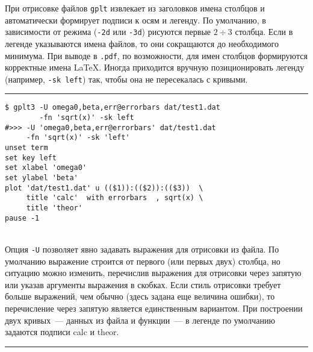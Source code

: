 \documentclass[12pt]{article}
\def\gplt{{\tt gplt}}
\def\pdf{{\tt .pdf}}
\begin{document}
\vspace{5mm}
При отрисовке файлов \gplt{} извлекает из заголовков имена столбцов и автоматически формирует подписи к осям и легенду.
По умолчанию, в зависимости от режима (\verb'-2d' или \verb'-3d') рисуются первые $2\div3$ столбца.
Если в легенде указываются имена файлов,
то они сокращаются до необходимого минимума. При выводе в \pdf{}, по возможности, для имен столбцов формируются корректные имена \LaTeX.
Иногда приходится вручную позиционировать легенду (например, \verb'-sk left') так, чтобы она не пересекалась с кривыми.\\

\hrule %

\vspace{3mm}
\noindent
\begin{minipage}[b]{.59\textwidth}
\small
\begin{verbatim}
$ gplt3 -U omega0,beta,err@errorbars dat/test1.dat 
        -fn 'sqrt(x)' -sk left
#>>> -U 'omega0,beta,err@errorbars' dat/test1.dat 
     -fn 'sqrt(x)' -sk 'left'
unset term
set key left
set xlabel 'omega0'
set ylabel 'beta'
plot 'dat/test1.dat' u (($1)):(($2)):(($3))  \
     title 'calc'  with errorbars  , sqrt(x) \
     title 'theor'   
pause -1
\end{verbatim}
\end{minipage}
\\[5mm]
Опция \verb'-U' позволяет явно задавать выражения для отрисовки из файла. По умолчанию выражение строится от первого (или первых двух) столбца,
но ситуацию можно изменить, перечислив выражения для отрисовки через запятую или указав аргументы выражения в скобках. Если стиль
отрисовки требует больше выражений, чем обычно (здесь задана еще величина ошибки), то перечисление через запятую является единственным вариантом.
При построении двух кривых~--- данных из файла и функции~--- в легенде по умолчанию задаются подписи calc и theor.\\

\hrule %
\end{document}
